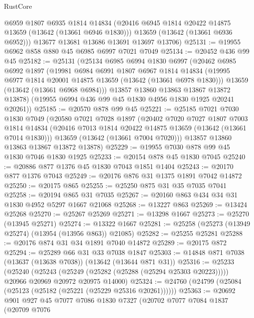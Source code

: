 \begin{lexlean}{RustCore}
\begin{coremodule}
        @6959
        @1807
        @6935
        @1814
        @14834
        (@20416 @6945 @1814 @20422 @14875 @13659 (@13642 (@13661 @6946 @1830)))
        @13659
        (@13642 (@13661 @6936 @6952)))
      @13677
      @13681
      @13686
      @13691
      @13697
      @13706)
@25131 := @19955 @6962 @858 @880 @45 @6985 @6997 @7021 @7049
@25134 := @20452 @436 @99 @45
@25182 := @25131
    (@25134
      @6985
      @6994
      @1830
      @6997
      (@20462
        @6985
        @6992
        @1897
        (@19981
          @6984
          @6991
          @1807
          @6967
          @1814
          @14834
          (@19995 @6977 @1814 @20001 @14875 @13659 (@13642 (@13661 @6978 @1830)))
          @13659
          (@13642 (@13661 @6968 @6984)))
        @13857
        @13860
        @13863
        @13867
        @13872
        @13878)
      (@19955 @6994 @436 @99 @45 @1830 @4956 @1830 @1925 @20241 @20261))
@25185 := @20570 @878 @99 @45
@25221 := @25185
    @7021
    @7030
    @1830
    @7049
    (@20580
      @7021
      @7028
      @1897
      (@20402
        @7020
        @7027
        @1807
        @7003
        @1814
        @14834
        (@20416 @7013 @1814 @20422 @14875 @13659 (@13642 (@13661 @7014 @1830)))
        @13659
        (@13642 (@13661 @7004 @7020)))
      @13857
      @13860
      @13863
      @13867
      @13872
      @13878)
@25229 := @19955 @7030 @878 @99 @45 @1830 @7046 @1830 @1925
@25233 := @20154 @878 @45 @1830 @7045
@25240 := @20886 @877 @1376 @45 @1830 @7043 @1851 @1404
@25243 := @20170 @877 @1376 @7043
@25249 := @20176 @876 @31 @1375 @1891 @7042 @14872
@25250 := @20175 @865
@25255 := @25250 @875 @31 @35 @7035 @7041
@25258 := @20194 @865 @31 @7035
@25267 := @20160 @863 @434 @34 @31 @1830 @4952 @5297 @1667 @21068
@25268 := @13227 @863
@25269 := @13424 @25268
@25270 := @25267 @25269
@25271 := @13298 @1667
@25273 := @25270 (@13945 @25271)
@25274 := @13322 @1667
@25281 := @25258 (@25273 (@13949 @25274) (@13954 (@13956 @863)) @21085)
@25282 := @25255 @25281
@25288 := @20176 @874 @31 @34 @1891 @7040 @14872
@25289 := @20175 @872
@25294 := @25289 @66 @31 @33 @7038 @1847
@25303 := @14848 @871 @7038 (@13637 (@13638 @7038)) (@13642 (@13644 @871 @31))
@25316 := @25233
    (@25240
      (@25243 (@25249 (@25282 (@25288 (@25294 @25303 @20223)))))
      @20966
      @20969
      @20972
      @20975
      @14000)
@25324 := @24760 (@24799 (@25084 (@25123 (@25182 (@25221 (@25229 @25316 @20261))))))
@25363 := @20692
    @901
    @927
    @45
    @7077
    @7086
    @1830
    @7327
    (@20702
      @7077
      @7084
      @1837
      (@20709
        @7076

\end{coremodule}
\end{lexlean}
